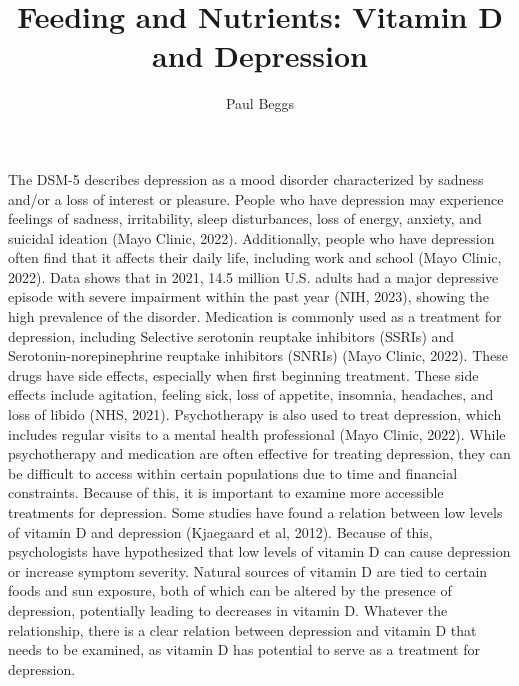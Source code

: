 \documentclass[stu]{apa7}
\title{Feeding and Nutrients: Vitamin D and Depression}
\author{Paul Beggs}
\begin{document}
\maketitle

\parencite{noauthor_depression_nodate}

The DSM-5 describes depression as a mood disorder characterized by sadness and/or a loss of interest or pleasure. People who have depression may experience feelings of sadness, irritability, sleep disturbances, loss of energy, anxiety, and suicidal ideation (Mayo Clinic, 2022). Additionally, people who have depression often find that it affects their daily life, including work and school  (Mayo Clinic, 2022). Data shows that in 2021, 14.5 million U.S. adults had a major depressive episode with severe impairment within the past year (NIH, 2023), showing the high prevalence of the disorder. Medication is commonly used as a treatment for depression, including Selective serotonin reuptake inhibitors (SSRIs) and Serotonin-norepinephrine reuptake inhibitors (SNRIs) (Mayo Clinic, 2022). These drugs have side effects, especially when first beginning treatment. These side effects include agitation, feeling sick, loss of appetite, insomnia, headaches, and loss of libido (NHS, 2021). Psychotherapy is also used to treat depression, which includes regular visits to a mental health professional (Mayo Clinic, 2022). While psychotherapy and medication are often effective for treating depression, they can be difficult to access within certain populations due to time and financial constraints. Because of this, it is important to examine more accessible treatments for depression. Some studies have found a relation between low levels of vitamin D and depression (Kjaegaard et al, 2012). Because of this, psychologists have hypothesized that low levels of vitamin D can cause depression or increase symptom severity. Natural sources of vitamin D are tied to certain foods and sun exposure, both of which can be altered by the presence of depression, potentially leading to decreases in vitamin D. Whatever the relationship, there is a clear relation between depression and vitamin D that needs to be examined, as vitamin D has potential to serve as a treatment for depression.

\printbibliography
\end{document}
